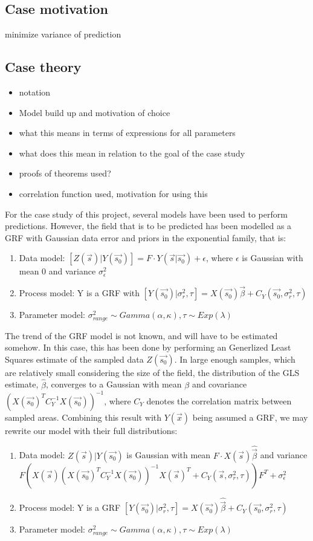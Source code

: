 \documentclass{report}
\begin{document}
\subsection{Case motivation}
minimize variance of prediction
\subsection{Case theory}
\begin{itemize}
\item notation
\item Model build up and motivation of choice
\item what this means in terms of expressions for all parameters
\item what does this mean in relation to the goal of the case study
\item proofs of theorems used?
\item correlation function used, motivation for using this
\end{itemize}
For the case study of this project, several models have been used to perform predictions. However, the field that is to be predicted has been modelled as a GRF with Gaussian data error and priors in the exponential family, that is: \\
\begin{enumerate}
\item Data model: $[Z(\vec{s})|Y(\vec{s_0})] = F \cdot Y(\vec{s} | \vec{s_0}) + \epsilon$, where $\epsilon$ is Gaussian with mean 0 and variance $\sigma_{\epsilon}^2$
\item Process model: Y is a GRF with $[Y(\vec{s_0}) | \sigma_{r}^2, \tau]  = X(\vec{s_0})\vec{\beta} + C_Y(\vec{s_0}, \sigma_{r}^2, \tau)$
\item Parameter model: $\sigma_{range}^2 \sim Gamma(\alpha, \kappa), \tau \sim Exp(\lambda)$ 
\end{enumerate}
The trend of the GRF model is not known, and will have to be estimated somehow. In this case, this has been done by performing an Generlized Least Squares estimate of the sampled data $Z(\vec{s_0})$. In large enough samples, which are relatively small considering the size of the field, the distribution of the GLS estimate, $\hat\beta$, converges to a Gaussian with mean $\beta$ and covariance $(X(\vec{s_0})^{T}C_Y^{-1}X(\vec{s_0}))^{-1}$, where $C_Y$ denotes the correlation matrix between sampled areas. Combining this result with $Y(\vec{x})$ being assumed a GRF, we may rewrite our model with their full distributions:
\begin{enumerate}
\item Data model: $Z(\vec{s})|Y(\vec{s_0})$ is Gaussian with mean $F \cdot X(\vec{s})\hat{\vec{\beta}}$ and variance $F(X(\vec{s})(X(\vec{s_0})^{T}C_Y^{-1}X(\vec{s_0}))^{-1}X(\vec{s})^T + C_Y(\vec{s}, \sigma_{r}^2, \tau))F^T + \sigma_{\epsilon}^2$ 
\item Process model: Y is a GRF $[Y(\vec{s_0}) | \sigma_{r}^2, \tau]  = X(\vec{s_0})\hat{\vec{\beta}} + C_Y(\vec{s_0}, \sigma_{r}^2, \tau)$
\item Parameter model: $\sigma_{range}^2 \sim Gamma(\alpha, \kappa), \tau \sim Exp(\lambda)$ 
\end{enumerate}
\end{document}
